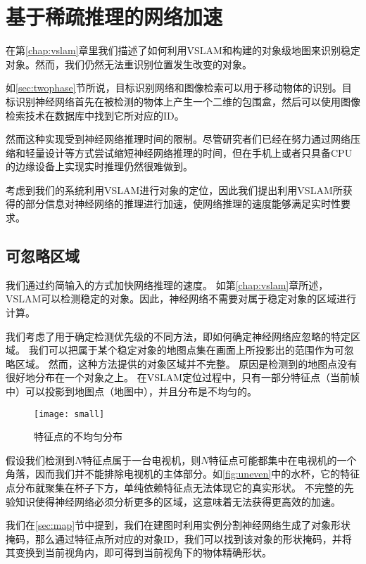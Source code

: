 \chapter{基于稀疏推理的网络加速}
\label{chap:sparse}
在第\ref{chap:vslam}章里我们描述了如何利用VSLAM和构建的对象级地图来识别稳定对象。然而，我们仍然无法重识别位置发生改变的对象。

如\ref{sec:twophase}节所说，目标识别网络和图像检索可以用于移动物体的识别。目标识别神经网络首先在被检测的物体上产生一个二维的包围盒，然后可以使用图像检索技术在数据库中找到它所对应的ID。

然而这种实现受到神经网络推理时间的限制。尽管研究者们已经在努力通过网络压缩和轻量设计等方式尝试缩短神经网络推理的时间，但在手机上或者只具备CPU的边缘设备上实现实时推理仍然很难做到。

考虑到我们的系统利用VSLAM进行对象的定位，因此我们提出利用VSLAM所获得的部分信息对神经网络的推理进行加速，使网络推理的速度能够满足实时性要求。

\section{可忽略区域}

我们通过约简输入的方式加快网络推理的速度。
如第\ref{chap:vslam}章所述，VSLAM可以检测稳定的对象。因此，神经网络不需要对属于稳定对象的区域进行计算。

我们考虑了用于确定检测优先级的不同方法，即如何确定神经网络应忽略的特定区域。
我们可以把属于某个稳定对象的地图点集在画面上所投影出的范围作为可忽略区域。
然而，这种方法提供的对象区域并不完整。
原因是检测到的地图点没有很好地分布在一个对象之上。
在VSLAM定位过程中，只有一部分特征点（当前帧中）可以投影到地图点（地图中），并且分布是不均匀的。

\begin{figure}[htbp]
	\centering
	\texttt{[image: small]}
	\caption{特征点的不均匀分布}
	\label{fig:uneven}
\end{figure}

假设我们检测到$N$特征点属于一台电视机，则$N$特征点可能都集中在电视机的一个角落，因而我们并不能排除电视机的主体部分。如\autoref{fig:uneven}中的水杯，它的特征点分布就聚集在杯子下方，单纯依赖特征点无法体现它的真实形状。
不完整的先验知识使得神经网络必须分析更多的区域，这意味着无法获得更高效的加速。

我们在\ref{sec:map}节中提到，我们在建图时利用实例分割神经网络生成了对象形状掩码，那么通过特征点所对应的对象ID，我们可以找到该对象的形状掩码，并将其变换到当前视角内，即可得到当前视角下的物体精确形状。

